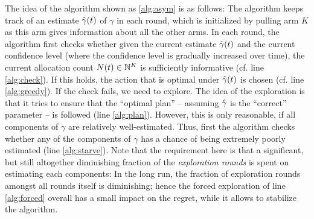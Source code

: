 The idea of the algorithm shown as \cref{alg:asym} is as follows:
The algorithm keeps track of an estimate $\hat{\gamma}(t)$ of $\gamma$ in each round, which is initialized by pulling arm $K$ as this arm
gives information about all the other arms.
In each round, the algorithm first checks whether given the current estimate $\hat{\gamma}(t)$ and the current confidence level (where the confidence level is gradually increased over time), the current allocation count $N(t)\in \mathbb{N}^K$
is sufficiently informative (cf. line \ref{alg:check}). If this holds, the action that is optimal under $\hat{\gamma}(t)$ is chosen 
(cf. line \ref{alg:greedy}). If the check fails, we need to explore.
The idea of the exploration is that it tries to ensure that the ``optimal plan'' -- assuming $\hat{\gamma}$ is the ``correct'' parameter -- is followed (line \ref{alg:plan}). However, this is only reasonable, if all components of $\gamma$ are relatively well-estimated.
Thus, first the algorithm checks whether any of the components of $\gamma$ has a chance of being
extremely poorly estimated (line \ref{alg:starve}). Note that the requirement here is that a significant, but still altogether diminishing fraction of the \emph{exploration rounds} is spent on estimating each components: In the long run, the fraction of exploration rounds amongst all rounds itself is diminishing; hence the forced exploration of line \ref{alg:forced} overall has a small impact on the regret, while it allows to stabilize the algorithm.

